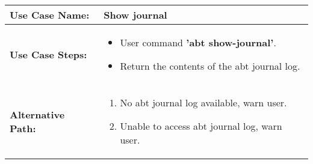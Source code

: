 \medskip

\begin{tabularx}{\linewidth}{|l|X|}
\hline
\textbf{Use Case Name:} & \textbf{Show journal} \\
\hline
\textbf{Use Case Steps:} & 
\begin{minipage}{\linewidth} 
  \vspace{0.05em}
  \begin{itemize}
    \item User command \textbf{'abt show-journal'}.
    \item Return the contents of the abt journal log.
  \end{itemize}
  \vspace{0.05em}
\end{minipage}
\\
\hline 
\textbf{Alternative Path:} &
\begin{minipage}{\linewidth}
  \vspace{0.05em} 
  \begin{enumerate}
    \item No abt journal log available, warn user.
    \item Unable to access abt journal log, warn user.
  \end{enumerate}
  \vspace{0.05em} 
\end{minipage}
\\
\hline
\end{tabularx}

\newpage


